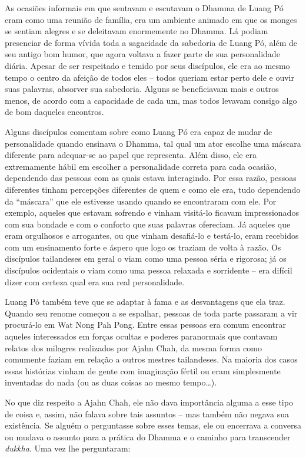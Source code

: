 As ocasiões informais em que sentavam e escutavam o Dhamma de Luang Pó
eram como uma reunião de família, era um ambiente animado em que os
monges se sentiam alegres e se deleitavam enormemente no Dhamma. Lá
podiam presenciar de forma vívida toda a sagacidade da sabedoria de
Luang Pó, além de seu antigo bom humor, que agora voltava a fazer parte
de sua personalidade diária. Apesar de ser respeitado e temido por seus
discípulos, ele era ao mesmo tempo o centro da afeição de todos eles --
todos queriam estar perto dele e ouvir suas palavras, absorver sua
sabedoria. Alguns se beneficiavam mais e outros menos, de acordo com a
capacidade de cada um, mas todos levavam consigo algo de bom daqueles
encontros.

Alguns discípulos comentam sobre como Luang Pó era capaz de mudar de
personalidade quando ensinava o Dhamma, tal qual um ator escolhe uma
máscara diferente para adequar-se ao papel que representa. Além disso,
ele era extremamente hábil em escolher a personalidade correta para cada
ocasião, dependendo das pessoas com as quais estava interagindo. Por
essa razão, pessoas diferentes tinham percepções diferentes de quem e
como ele era, tudo dependendo da ``máscara'' que ele estivesse usando
quando se encontraram com ele. Por exemplo, aqueles que estavam sofrendo
e vinham visitá-lo ficavam impressionados com sua bondade e com o
conforto que suas palavras ofereciam. Já aqueles que eram orgulhosos e
arrogantes, ou que vinham desafiá-lo e testá-lo, eram recebidos com um
ensinamento forte e áspero que logo os traziam de volta à razão. Os
discípulos tailandeses em geral o viam como uma pessoa séria e rigorosa;
já os discípulos ocidentais o viam como uma pessoa relaxada e sorridente
-- era difícil dizer com certeza qual era sua real personalidade.

Luang Pó também teve que se adaptar à fama e as desvantagens que ela
traz. Quando seu renome começou a se espalhar, pessoas de toda parte
passaram a vir procurá-lo em Wat Nong Pah Pong. Entre essas pessoas era
comum encontrar aqueles interessados em forças ocultas e poderes
paranormais que contavam relatos dos milagres realizados por Ajahn Chah,
da mesma forma como comumente faziam em relação a outros mestres
tailandeses. Na maioria dos casos essas histórias vinham de gente com
imaginação fértil ou eram simplesmente inventadas do nada (ou as duas
coisas ao mesmo tempo\ldots{}).

No que diz respeito a Ajahn Chah, ele não dava importância alguma a esse
tipo de coisa e, assim, não falava sobre tais assuntos -- mas também não
negava sua existência. Se alguém o perguntasse sobre esses temas, ele ou
encerrava a conversa ou mudava o assunto para a prática do Dhamma e o
caminho para transcender \emph{dukkha}. Uma vez lhe perguntaram:

